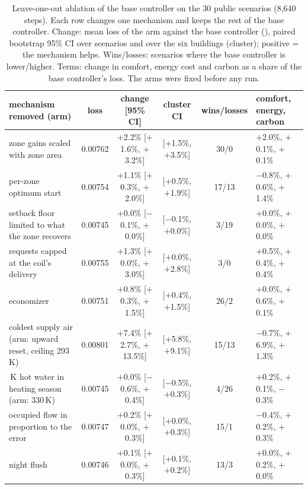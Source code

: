 \begin{table}[t]
\caption{Leave-one-out ablation of the base controller on the 30 public scenarios (8,640 steps). Each row changes one mechanism and keeps the rest of the base controller. Change: mean loss of the arm against the base controller (\RElvAbRefLoss), paired bootstrap 95\% CI over scenarios and over the six buildings (cluster); positive = the mechanism helps. Wins/losses: scenarios where the base controller is lower/higher. Terms: change in comfort, energy cost and carbon as a share of the base controller's loss. The arms were fixed before any run.}
\label{tab:ablation12}
\centering\scriptsize
\setlength{\tabcolsep}{2pt}
\begin{tabular}{>{\raggedright\arraybackslash}p{3.8cm}cccc>{\raggedright\arraybackslash}p{2.5cm}}
\toprule
mechanism removed (arm) & loss & change [95\% CI] & cluster CI & wins/losses & comfort, energy, carbon \\
\midrule
zone gains scaled with zone area & 0.00762 & $+$2.2\% [$+$1.6\%, $+$3.2\%] & [$+$1.5\%, $+$3.5\%] & 30/0 & $+$2.0\%, $+$0.1\%, $+$0.1\% \\
per-zone optimum start & 0.00754 & $+$1.1\% [$+$0.3\%, $+$2.0\%] & [$+$0.5\%, $+$1.9\%] & 17/13 & $-$0.8\%, $+$0.6\%, $+$1.4\% \\
setback floor limited to what the zone recovers & 0.00745 & $+$0.0\% [$-$0.1\%, $+$0.0\%] & [$-$0.1\%, $+$0.0\%] & 3/19 & $+$0.0\%, $+$0.0\%, $+$0.0\% \\
requests capped at the coil's delivery & 0.00755 & $+$1.3\% [$+$0.0\%, $+$3.0\%] & [$+$0.0\%, $+$2.8\%] & 3/0 & $+$0.5\%, $+$0.4\%, $+$0.4\% \\
economizer & 0.00751 & $+$0.8\% [$+$0.3\%, $+$1.5\%] & [$+$0.4\%, $+$1.5\%] & 26/2 & $+$0.0\%, $+$0.6\%, $+$0.1\% \\
coldest supply air (arm: upward reset, ceiling 293\,K) & 0.00801 & $+$7.4\% [$+$2.7\%, $+$13.5\%] & [$+$5.8\%, $+$9.1\%] & 15/13 & $-$0.7\%, $+$6.9\%, $+$1.3\% \\
350\,K hot water in heating season (arm: 330\,K) & 0.00745 & $+$0.0\% [$-$0.6\%, $+$0.4\%] & [$-$0.5\%, $+$0.3\%] & 4/26 & $+$0.2\%, $+$0.1\%, $-$0.3\% \\
occupied flow in proportion to the error & 0.00747 & $+$0.2\% [$+$0.0\%, $+$0.3\%] & [$+$0.0\%, $+$0.3\%] & 15/1 & $-$0.4\%, $+$0.2\%, $+$0.3\% \\
night flush & 0.00746 & $+$0.1\% [$+$0.0\%, $+$0.3\%] & [$+$0.1\%, $+$0.2\%] & 13/3 & $+$0.0\%, $+$0.2\%, $+$0.0\% \\

\end{tabular}
\end{table}
